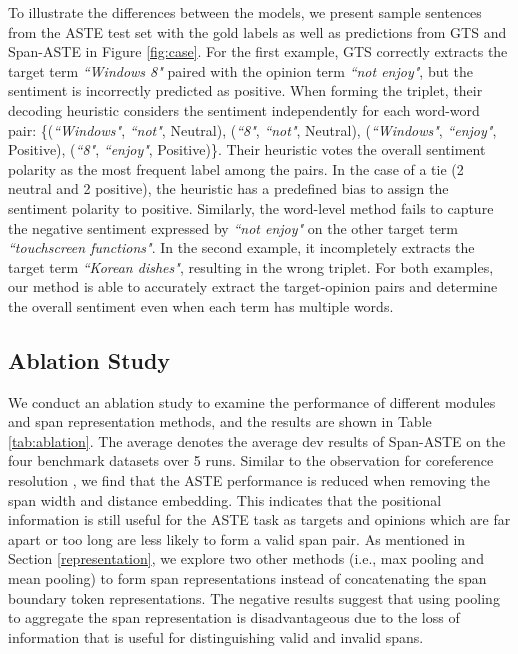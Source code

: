 \documentclass[11pt,a4paper]{article}
\begin{document}
To illustrate the differences between the models, we present sample sentences from the ASTE test set
with the gold labels as well as predictions from GTS \cite{wu-etal-2020-grid} and 
Span-ASTE in Figure \ref{fig:case}. 
For the first example, GTS correctly extracts the target term \textit{``Windows 8"} paired with the opinion term \textit{``not enjoy"}, but the sentiment is incorrectly predicted as positive.
When forming the triplet, their decoding heuristic considers the sentiment independently for each word-word pair: 
\{(\textit{``Windows"}, \textit{``not"}, Neutral), (\textit{``8"}, \textit{``not"}, Neutral), (\textit{``Windows"}, \textit{``enjoy"}, Positive), (\textit{``8"}, \textit{``enjoy"}, Positive)\}.
Their heuristic votes the overall sentiment polarity as the most frequent label among the pairs.
In the case of a tie (2 neutral and 2 positive), the heuristic has a predefined bias to assign the sentiment polarity to positive.
Similarly, the word-level method fails to capture the negative sentiment expressed by \textit{``not enjoy"} on the other target term \textit{``touchscreen functions"}.
In the second example, it incompletely extracts the target term \textit{``Korean dishes"}, resulting in the wrong triplet.
For both examples, our method is able to accurately extract the target-opinion pairs and determine the overall sentiment even when each term has multiple words.





















\subsection{Ablation Study}

We conduct an ablation study to examine the performance of different modules and span representation methods,
and the results are shown in Table  \ref{tab:ablation}. The average  denotes the average dev results of 
Span-ASTE on the four benchmark datasets over 5 runs. Similar to the observation for coreference resolution \cite{lee-etal-2017-end}, we find that the ASTE performance is reduced when removing the span width and distance embedding. 
This indicates that the positional information is still useful for the ASTE task as targets and opinions which are far apart or too long are less likely to form a valid span pair.
As mentioned in Section \ref{representation}, we explore two other methods (i.e., max pooling and mean pooling) to form span representations instead of concatenating the span boundary token representations.
The negative results suggest that using pooling to aggregate the span representation is disadvantageous due to the loss of information that is useful for distinguishing valid and invalid spans.
\end{document}
